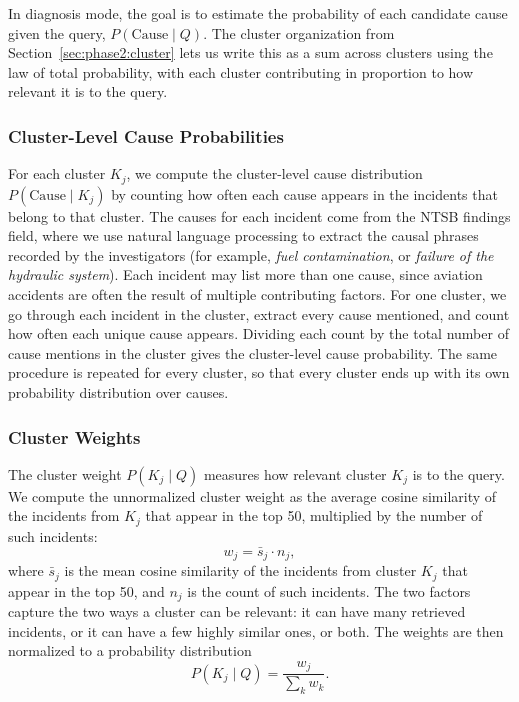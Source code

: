 \documentclass[11pt]{article}
\begin{document}
In diagnosis mode, the goal is to estimate the probability of each candidate cause given the query, $P(\text{Cause} \mid Q)$. The cluster organization from Section~\ref{sec:phase2:cluster} lets us write this as a sum across clusters using the law of total probability, with each cluster contributing in proportion to how relevant it is to the query.

\subsubsection{Cluster-Level Cause Probabilities}
\label{sec:phase2:diag:cluster}

For each cluster $K_j$, we compute the cluster-level cause distribution $P(\text{Cause} \mid K_j)$ by counting how often each cause appears in the incidents that belong to that cluster. The causes for each incident come from the NTSB findings field, where we use natural language processing to extract the causal phrases recorded by the investigators (for example, \emph{fuel contamination}, or \emph{failure of the hydraulic system}). Each incident may list more than one cause, since aviation accidents are often the result of multiple contributing factors. For one cluster, we go through each incident in the cluster, extract every cause mentioned, and count how often each unique cause appears. Dividing each count by the total number of cause mentions in the cluster gives the cluster-level cause probability. The same procedure is repeated for every cluster, so that every cluster ends up with its own probability distribution over causes.

\subsubsection{Cluster Weights}
\label{sec:phase2:diag:weights}

The cluster weight $P(K_j \mid Q)$ measures how relevant cluster $K_j$ is to the query. We compute the unnormalized cluster weight as the average cosine similarity of the incidents from $K_j$ that appear in the top 50, multiplied by the number of such incidents:
\begin{equation}
w_j = \bar{s}_j \cdot n_j,
\label{eq:cluster_weight}
\end{equation}
where $\bar{s}_j$ is the mean cosine similarity of the incidents from cluster $K_j$ that appear in the top 50, and $n_j$ is the count of such incidents. The two factors capture the two ways a cluster can be relevant: it can have many retrieved incidents, or it can have a few highly similar ones, or both. The weights are then normalized to a probability distribution
\begin{equation}
P(K_j \mid Q) = \frac{w_j}{\sum_{k} w_k}.
\label{eq:cluster_norm}
\end{equation}
\end{document}
